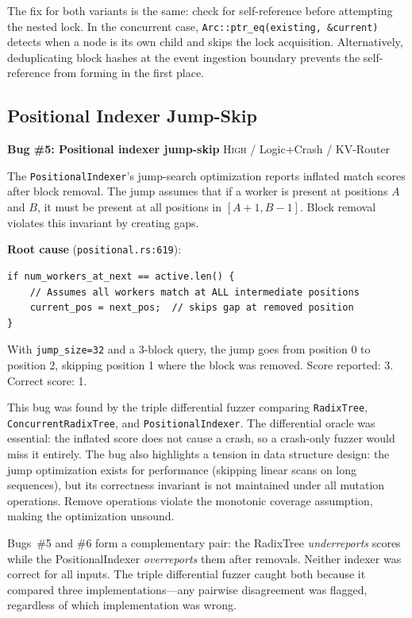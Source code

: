 The fix for both variants is the same: check for self-reference before attempting the nested lock. In the concurrent case, \texttt{Arc::ptr\_eq(existing, \&current)} detects when a node is its own child and skips the lock acquisition. Alternatively, deduplicating block hashes at the event ingestion boundary prevents the self-reference from forming in the first place.

\subsection{Positional Indexer Jump-Skip}

\begin{bugbox}
\textbf{Bug \#5: Positional indexer jump-skip} \hfill \textsc{High} / Logic+Crash / KV-Router

The \texttt{PositionalIndexer}'s jump-search optimization reports inflated match scores after block removal. The jump assumes that if a worker is present at positions $A$ and $B$, it must be present at all positions in $[A+1, B-1]$. Block removal violates this invariant by creating gaps.

\medskip
\textbf{Root cause} (\texttt{positional.rs:619}):
\begin{verbatim}
if num_workers_at_next == active.len() {
    // Assumes all workers match at ALL intermediate positions
    current_pos = next_pos;  // skips gap at removed position
}
\end{verbatim}

With \texttt{jump\_size=32} and a 3-block query, the jump goes from position 0 to position 2, skipping position 1 where the block was removed. Score reported: 3. Correct score: 1.
\end{bugbox}

This bug was found by the triple differential fuzzer comparing \texttt{RadixTree}, \texttt{ConcurrentRadixTree}, and \texttt{PositionalIndexer}. The differential oracle was essential: the inflated score does not cause a crash, so a crash-only fuzzer would miss it entirely. The bug also highlights a tension in data structure design: the jump optimization exists for performance (skipping linear scans on long sequences), but its correctness invariant is not maintained under all mutation operations. Remove operations violate the monotonic coverage assumption, making the optimization unsound.

\begin{notebox}
Bugs~\#5 and \#6 form a complementary pair: the RadixTree \emph{underreports} scores while the PositionalIndexer \emph{overreports} them after removals. Neither indexer was correct for all inputs. The triple differential fuzzer caught both because it compared three implementations---any pairwise disagreement was flagged, regardless of which implementation was wrong.
\end{notebox}

